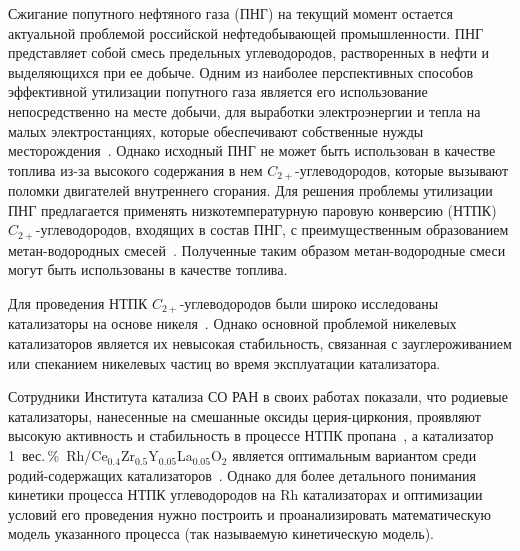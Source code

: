 \documentclass{cmi}
\begin{document}
Сжигание попутного нефтяного газа (ПНГ) на текущий момент остается актуальной проблемой российской нефтедобывающей промышленности. 
ПНГ представляет собой смесь предельных углеводородов, растворенных в нефти и выделяющихся при ее добыче. 
Одним из наиболее перспективных способов эффективной утилизации попутного газа является его использование непосредственно на месте добычи, для выработки электроэнергии и тепла на малых электростанциях, которые обеспечивают собственные нужды месторождения~\cite{UskovPSSKS2019}. Однако исходный ПНГ не может быть использован в качестве топлива из-за высокого содержания в нем $C_{2+}$-углеводородов, которые вызывают поломки двигателей внутреннего сгорания. Для решения проблемы утилизации ПНГ предлагается применять низкотемпературную паровую конверсию (НТПК) $C_{2+}$-углеводородов, входящих в состав ПНГ, с преимущественным образованием метан-водородных смесей~\cite{ZyryanovaSSBKS2014}. Полученные таким образом метан-водородные смеси могут быть использованы в качестве топлива.

Для проведения НТПК $C_{2+}$-углеводородов были широко исследованы катализаторы на основе никеля~\cite{EnikeevaPUSSEG21,PotemkinUGKSB2020,ShigarovUP2022,UskovPSSKS2019}. Однако основной проблемой никелевых катализаторов является их невысокая стабильность, связанная с зауглероживанием или спеканием никелевых частиц во время эксплуатации катализатора.

Сотрудники Института катализа СО РАН в своих работах показали, что родиевые катализаторы, нанесенные на смешанные оксиды церия-циркония, проявляют высокую активность и стабильность в процессе НТПК пропана~\cite{UrlukovUSP22:ru,UrlukovUSBRRS23:ru,GarkulZFBBP2024,UrlukovUSSP2022,ZadesenetsGFSPP2023}, а катализатор 1~вес.\,\%~Rh/Ce$_{0.4}$Zr$_{0.5}$Y$_{0.05}$La$_{0.05}$O$_2$ является оптимальным вариантом среди родий-содержащих катализаторов~\cite{UrlukovUSBRRS23:ru}.
Однако для более детального понимания кинетики процесса НТПК углеводородов на Rh катализаторах и оптимизации условий его проведения нужно построить и проанализировать математическую модель указанного процесса (так называемую кинетическую модель).

\end{document}
